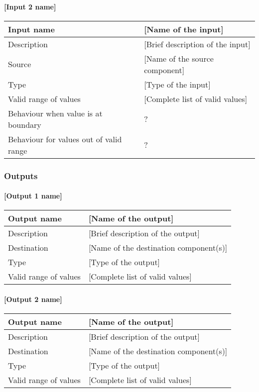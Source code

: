 \paragraph{[Input 2 name]}

\begin{longtable}{p{}p{}}
\toprule
Input name				& [Name of the input] \\
\midrule
Description				& [Brief description of the input] \\
\midrule
Source					& [Name of the source component] \\ 
\midrule
Type						& [Type of the input] \\
\midrule
Valid range of values	& [Complete list of valid values] \\
\midrule
Behaviour when value is at boundary	& ? \\
\midrule
Behaviour for values out of valid range	& ? \\
\bottomrule
\end{longtable}


\subsubsection{Outputs}

\paragraph{[Output 1 name]}

\begin{longtable}{p{}p{}}
\toprule
Output name				& [Name of the output] \\
\midrule
Description				& [Brief description of the output] \\
\midrule
Destination				& [Name of the destination component(s)] \\ 
\midrule
Type						& [Type of the output] \\
\midrule
Valid range of values	& [Complete list of valid values] \\
\bottomrule
\end{longtable}


\paragraph{[Output 2 name]}

\begin{longtable}{p{}p{}}
\toprule
Output name				& [Name of the output] \\
\midrule
Description				& [Brief description of the output] \\
\midrule
Destination				& [Name of the destination component(s)] \\ 
\midrule
Type						& [Type of the output] \\
\midrule
Valid range of values	& [Complete list of valid values] \\
\bottomrule
\end{longtable}
